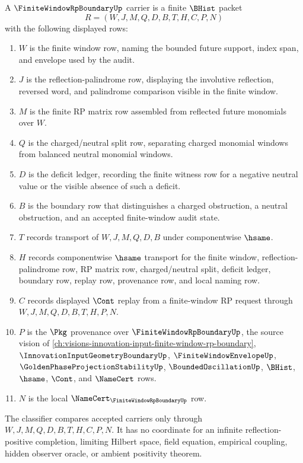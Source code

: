 \begin{definition}
\label{def:finite-window-rp-carrier}
A $\FiniteWindowRpBoundaryUp$ carrier is a finite $\BHist$ packet
$$
R=(W,J,M,Q,D,B,T,H,C,P,N)
$$
with the following displayed rows:
\begin{enumerate}
\item $W$ is the finite window row, naming the bounded future support, index span, and envelope used by the audit.
\item $J$ is the reflection-palindrome row, displaying the involutive reflection, reversed word, and palindrome comparison visible in the finite window.
\item $M$ is the finite RP matrix row assembled from reflected future monomials over $W$.
\item $Q$ is the charged/neutral split row, separating charged monomial windows from balanced neutral monomial windows.
\item $D$ is the deficit ledger, recording the finite witness row for a negative neutral value or the visible absence of such a deficit.
\item $B$ is the boundary row that distinguishes a charged obstruction, a neutral obstruction, and an accepted finite-window audit state.
\item $T$ records transport of $W,J,M,Q,D,B$ under componentwise $\hsame$.
\item $H$ records componentwise $\hsame$ transport for the finite window, reflection-palindrome row, RP matrix row, charged/neutral split, deficit ledger, boundary row, replay row, provenance row, and local naming row.
\item $C$ records displayed $\Cont$ replay from a finite-window RP request through $W,J,M,Q,D,B,T,H,P,N$.
\item $P$ is the $\Pkg$ provenance over $\FiniteWindowRpBoundaryUp$, the source vision of \autoref{ch:visions-innovation-input-finite-window-rp-boundary}, $\InnovationInputGeometryBoundaryUp$, $\FiniteWindowEnvelopeUp$, $\GoldenPhaseProjectionStabilityUp$, $\BoundedOscillationUp$, $\BHist$, $\hsame$, $\Cont$, and $\NameCert$ rows.
\item $N$ is the local $\NameCert_{\FiniteWindowRpBoundaryUp}$ row.
\end{enumerate}
The classifier compares accepted carriers only through $W,J,M,Q,D,B,T,H,C,P,N$. It has no coordinate for an infinite reflection-positive completion, limiting Hilbert space, field equation, empirical coupling, hidden observer oracle, or ambient positivity theorem.
\end{definition}

